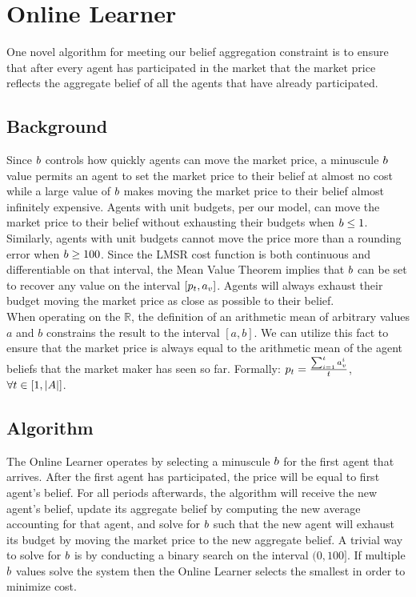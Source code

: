 \section{Online Learner}
One novel algorithm for meeting our belief aggregation constraint is to ensure that after every agent has participated in the market that the market price reflects the aggregate belief of all the agents that have already participated.

\subsection{Background}
Since $b$ controls how quickly agents can move the market price, a minuscule $b$ value permits an agent to set the market price to their belief at almost no cost while a large value of $b$ makes moving the market price to their belief almost infinitely expensive. Agents with unit budgets, per our model, can move the market price to their belief without exhausting their budgets when $b \leq 1$. Similarly, agents with unit budgets cannot move the price more than a rounding error when $b \ge 100$. Since the LMSR cost function is both continuous and differentiable on that interval, the Mean Value Theorem implies that $b$ can be set to recover any value on the interval $[p_t, a_v]$. Agents will always exhaust their budget moving the market price as close as possible to their belief.\\

When operating on the $\mathbb{R}$, the definition of an arithmetic mean of arbitrary values $a$ and $b$ constrains the result to the interval $[a,b]$. We can utilize this fact to ensure that the market price is always equal to the arithmetic mean of the agent beliefs that the market maker has seen so far. Formally: $p_t = \frac{\sum_{i=1}^{t} a^{i}_v}{t}$, $\forall t \in [1,|A|]$.\\

\subsection{Algorithm}
The Online Learner operates by selecting a minuscule $b$ for the first agent that arrives. After the first agent has participated, the price will be equal to first agent's belief. For all periods afterwards, the algorithm will receive the new agent's belief, update its aggregate belief by computing the new average accounting for that agent, and solve for $b$ such that the new agent will exhaust its budget by moving the market price to the new aggregate belief. A trivial way to solve for $b$ is by conducting a binary search on the interval $(0, 100]$. If multiple $b$ values solve the system then the Online Learner selects the smallest in order to minimize cost.\\

